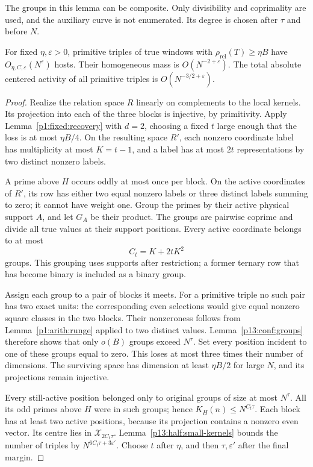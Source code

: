 The groups in this lemma can be composite. Only divisibility
and coprimality are used, and the auxiliary curve is not
enumerated. Its degree is chosen after \(\tau\) and before
\(N\).

\begin{theorem}
\label{p13:conf:dense-primitive}
For fixed \(\eta,\varepsilon>0\), primitive triples of
true windows with \(\rho_{\mathrm{rel}}(T)\ge\eta B\)
have \(O_{\eta,C,\varepsilon}(N^\varepsilon)\) hosts.
Their homogeneous mass is \(O(N^{-2+\varepsilon})\).
The total absolute centered activity of all primitive
triples is \(O(N^{-3/2+\varepsilon})\).
\end{theorem}

\begin{proof}
Realize the relation space \(R\) linearly on complements
to the local kernels. Its projection into each of the
three blocks is injective, by primitivity.
Apply Lemma~\ref{p1:fixed:recovery} with \(d=2\),
choosing a fixed \(t\) large enough that the loss is at
most \(\eta B/4\). On the resulting space \(R'\),
each nonzero coordinate label has multiplicity at most
\(K=t-1\), and a label has at most \(2t\)
representations by two distinct nonzero labels.

A prime above \(H\) occurs oddly at most once per block.
On the active coordinates of \(R'\), its row has either
two equal nonzero labels or three distinct labels
summing to zero; it cannot have weight one.
Group the primes by their active physical support \(A\),
and let \(G_A\) be their product.
The groups are pairwise coprime and divide all true
values at their support positions.
Every active coordinate belongs to at most
\[
 C_t=K+2tK^2
\]
groups. This grouping uses supports after restriction;
a former ternary row that has become binary is included
as a binary group.

Assign each group to a pair of blocks it meets.
For a primitive triple no such pair has two exact units:
the corresponding even selections would give equal
nonzero square classes in the two blocks.
Their nonzeroness follows from
Lemma~\ref{p1:arith:runge} applied to two distinct values.
Lemma~\ref{p13:conf:groups} therefore shows that only
\(o(B)\) groups exceed \(N^\tau\).
Set every position incident to one of these groups
equal to zero. This loses at most three times their
number of dimensions.
The surviving space has dimension at least \(\eta B/2\)
for large \(N\), and its projections remain injective.

Every still-active position belonged only to original
groups of size at most \(N^\tau\). All its odd primes
above \(H\) were in such groups; hence
\(K_H(n)\le N^{C_t\tau}\).
Each block has at least two active positions, because
its projection contains a nonzero even vector.
Its centre lies in \(\mathcal X_{2C_t\tau}\).
Lemma~\ref{p13:half:small-kernels} bounds the number
of triples by \(N^{6C_t\tau+3\varepsilon'}\).
Choose \(t\) after \(\eta\), and then \(\tau,\varepsilon'\)
after the final margin.


\end{proof}
